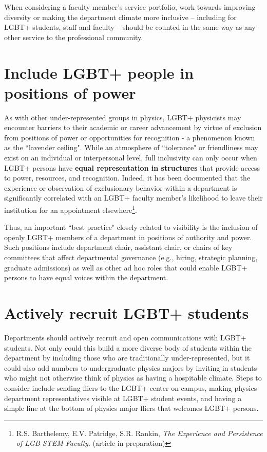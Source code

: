 When considering a faculty member's service portfolio, work towards improving diversity or making the department climate more inclusive -- including for LGBT+ students, staff and faculty -- should be counted in the same way as any other service to the professional community.


\section {Include LGBT+ people in positions of power}
\label{positions-of-power}
As with other under-represented groups in physics, LGBT+ physicists may encounter barriers to their academic or career advancement by virtue of exclusion from positions of power or opportunities for recognition - a phenomenon known as the ``lavender ceiling". While an atmosphere of ``tolerance" or friendliness may exist on an individual or interpersonal level, full inclusivity can only occur when LGBT+ persons have \textbf{equal representation in structures} that provide access to power, resources, and recognition. Indeed, it has been documented that the experience or observation of exclusionary behavior within a department is significantly correlated with an LGBT+ faculty member's likelihood to leave their institution for an appointment elsewhere\footnote{R.S. Barthelemy, E.V. Patridge, S.R. Rankin, \emph{The Experience and Persistence of LGB STEM Faculty}. (article in preparation)}.

Thus, an important ``best practice" closely related to visibility is the inclusion of openly LGBT+ members of a department in positions of authority and power. Such positions include department chair, assistant chair, or chairs of key committees that affect departmental governance (e.g., hiring, strategic planning, graduate admissions) as well as other ad hoc roles that could enable LGBT+ persons to have equal voices within the department.

\vspace{\baselineskip}
\section {Actively recruit LGBT+ students}
\label{recruit-students}
Departments should actively recruit and open communications with LGBT+ students. Not only could this build a more diverse body of students within the department by including those who are traditionally under-represented, but it could also add numbers to undergraduate physics majors by inviting in students who might not otherwise think of physics as having a hospitable climate. Steps to consider include sending fliers to the LGBT+ center on campus, making physics department representatives visible at LGBT+ student events, and having a simple line at the bottom of physics major fliers that welcomes LGBT+ persons. 

